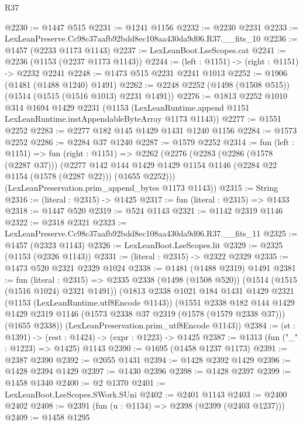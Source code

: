 \begin{lexlean}{R37}
\begin{coremodule}
@2230 := @1447 @515
@2231 := @1241 @1156
@2232 := @2230 @2231
@2233 := LexLeanPreserve.Cc98c37aafb92bdd8ec108aa430da9d06.R37.__fits_10
@2236 := @1457 (@2233 @1173 @1143)
@2237 := LexLeanBoot.LseScopes.cat
@2241 := @2236 (@1153 (@2237 @1173 @1143))
@2244 := (left : @1151) -> (right : @1151) -> @2232 @2241
@2248 := @1473 @515 @2231 @2241 @1013
@2252 := @1906 (@1481 (@1488 @1240) @1491)
@2262 := @2248 @2252 (@1498 (@1508 @515)) (@1514 (@1515 (@1516 @1013) @2231 @1491))
@2276 := @1813
    @2252
    @1010
    @314
    @1694
    @1429
    @2231
    (@1153 (LexLeanRuntime.append @1151 LexLeanRuntime.instAppendableByteArray @1173 @1143))
@2277 := @1551 @2252
@2283 := @2277 @182 @145 @1429 @1431 @1240 @1156
@2284 := @1573 @2252
@2286 := @2284 @37 @1240
@2287 := @1579 @2252
@2314 := fun (left : @1151) =>
  fun (right : @1151) =>
  @2262
    (@2276
      (@2283
        (@2286 (@1578 (@2287 @37)))
        (@2277
          @142
          @144
          @1429
          @1429
          @1154
          @1146
          (@2284 @22 @1154 (@1578 (@2287 @22)))
          (@1655 @2252)))
      (LexLeanPreservation.prim_append_bytes @1173 @1143))
@2315 := String
@2316 := (literal : @2315) -> @1425
@2317 := fun (literal : @2315) => @1433
@2318 := @1447 @520
@2319 := @524 @1143
@2321 := @1142 @2319 @1146
@2322 := @2318 @2321
@2323 := LexLeanPreserve.Cc98c37aafb92bdd8ec108aa430da9d06.R37.__fits_11
@2325 := @1457 (@2323 @1143)
@2326 := LexLeanBoot.LseScopes.lit
@2329 := @2325 (@1153 (@2326 @1143))
@2331 := (literal : @2315) -> @2322 @2329
@2335 := @1473 @520 @2321 @2329 @1024
@2338 := @1481 (@1488 @2319) @1491
@2381 := fun (literal : @2315) =>
  @2335
    @2338
    (@1498 (@1508 @520))
    (@1514 (@1515 (@1516 @1024) @2321 @1491))
    (@1813
      @2338
      @1021
      @184
      @1431
      @1429
      @2321
      (@1153 (LexLeanRuntime.utf8Encode @1143))
      (@1551
        @2338
        @182
        @144
        @1429
        @1429
        @2319
        @1146
        (@1573 @2338 @37 @2319 (@1578 (@1579 @2338 @37)))
        (@1655 @2338))
      (LexLeanPreservation.prim_utf8Encode @1143))
@2384 := (st : @1391) -> (rest : @1424) -> (expr : @1223) -> @1425
@2387 := @1313 (fun ("_" : @1223) => @1425) @1143
@2390 := @1695 (@1458 @1237 @1173)
@2391 := @2387 @2390
@2392 := @2055 @1431
@2394 := @1428 @2392 @1429
@2396 := @1428 @2394 @1429
@2397 := @1430 @2396
@2398 := @1428 @2397
@2399 := @1458 @1340
@2400 := @2 @1370
@2401 := LexLeanBoot.LseScopes.SWork.SUni
@2402 := @2401 @1143
@2403 := @2400 @2402
@2408 := @2391 (fun (u : @1134) => @2398 (@2399 (@2403 @1237)))
@2409 := @1458 @1295

\end{coremodule}
\end{lexlean}
